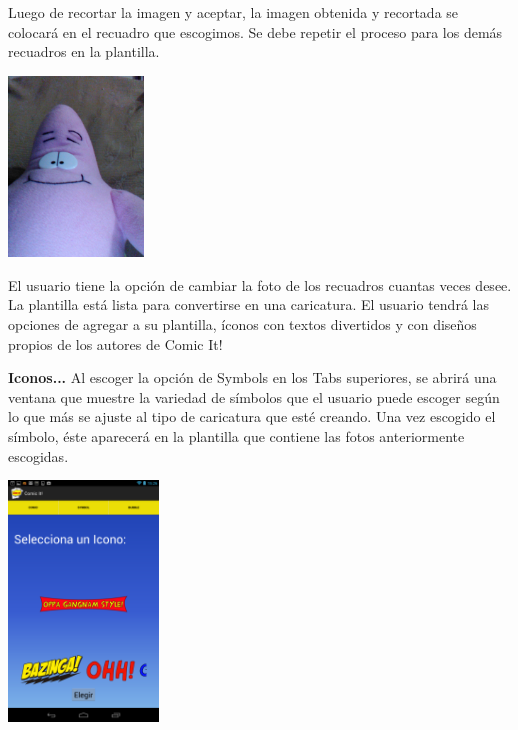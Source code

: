 \documentclass[12pt]{report}
\begin{document}
Luego de recortar la imagen y aceptar, la imagen obtenida y recortada se colocará en el recuadro que escogimos. Se debe repetir el proceso para los demás recuadros en la plantilla.
\newline
	\begin{center}
		\begingroup
			\includegraphics[width=0.27\textwidth]{imagenes_usuario/foto.jpg}
		\endgroup
	\end{center}


El usuario tiene la opción de cambiar la foto de los recuadros cuantas veces desee.
La plantilla está lista para convertirse en una caricatura.
El usuario tendrá las opciones de agregar a su plantilla, íconos con textos divertidos  y con diseños propios de los autores de Comic It!


\begingroup
		\large{
			\textbf{
				Iconos...
				\newline
				\newline
			}
		}
	\endgroup
Al escoger la opción de Symbols en los Tabs superiores, se abrirá una ventana que muestre la variedad de símbolos que el usuario puede escoger según lo que más se ajuste al tipo de caricatura que esté creando. Una vez escogido el símbolo, éste aparecerá en la plantilla que contiene las fotos anteriormente escogidas.
	\begin{center}
		\begingroup
			\includegraphics[width=0.30\textwidth]{imagenes_usuario/iconos.png}
		\endgroup
	\end{center}
\end{document}
